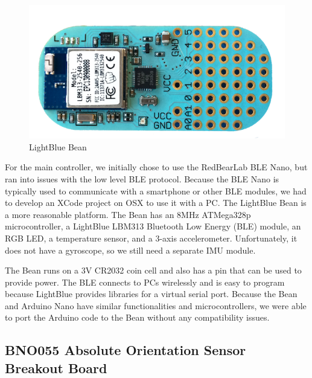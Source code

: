 \documentclass[10pt,journal]{IEEEtran}
\begin{document}
\begin{figure}[H]
    \includegraphics[width=0.8\linewidth]{figures/bean}
  \caption{LightBlue Bean}
  \label{fig:bean}
\end{figure}

For the main controller, we initially chose to use the RedBearLab BLE Nano, but ran into issues with the low level BLE protocol. Because the BLE Nano is typically used to communicate with a smartphone or other BLE modules, we had to develop an XCode project on OSX to use it with a PC.
The LightBlue Bean is a more reasonable platform. The Bean has an 8MHz ATMega328p microcontroller, a LightBlue LBM313 Bluetooth Low Energy (BLE) module, an RGB LED, a temperature sensor, and a 3-axis accelerometer. Unfortunately, it does not have a gyroscope, so we still need a separate IMU module. 
\par The Bean runs on a 3V CR2032 coin cell and also has a pin that can be used to provide power. The BLE connects to PCs wirelessly and is easy to program because LightBlue provides libraries for a virtual serial port. Because the Bean and Arduino Nano have similar functionalities and microcontrollers, we were able to port the Arduino code to the Bean without any compatibility issues.

\subsection{BNO055 Absolute Orientation Sensor Breakout Board}
\end{document}
